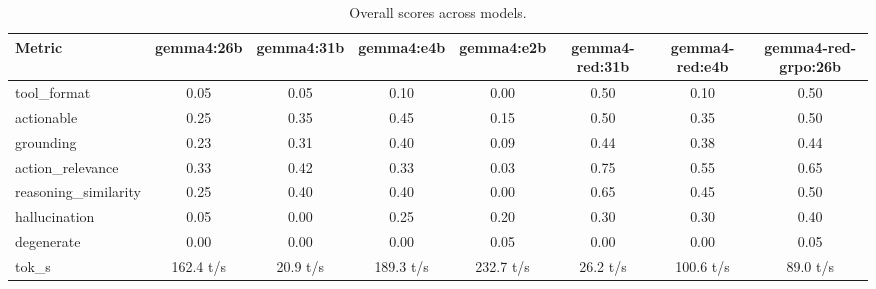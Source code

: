 \begin{table}[h]
\centering\small
\begin{tabular}{lccccccc}
\toprule
Metric & gemma4:26b & gemma4:31b & gemma4:e4b & gemma4:e2b & gemma4-red:31b & gemma4-red:e4b & gemma4-red-grpo:26b \\
\midrule
tool\_format & 0.05 & 0.05 & 0.10 & 0.00 & 0.50 & 0.10 & 0.50 \\
actionable & 0.25 & 0.35 & 0.45 & 0.15 & 0.50 & 0.35 & 0.50 \\
grounding & 0.23 & 0.31 & 0.40 & 0.09 & 0.44 & 0.38 & 0.44 \\
action\_relevance & 0.33 & 0.42 & 0.33 & 0.03 & 0.75 & 0.55 & 0.65 \\
reasoning\_similarity & 0.25 & 0.40 & 0.40 & 0.00 & 0.65 & 0.45 & 0.50 \\
hallucination & 0.05 & 0.00 & 0.25 & 0.20 & 0.30 & 0.30 & 0.40 \\
degenerate & 0.00 & 0.00 & 0.00 & 0.05 & 0.00 & 0.00 & 0.05 \\
tok\_s & 162.4 t/s & 20.9 t/s & 189.3 t/s & 232.7 t/s & 26.2 t/s & 100.6 t/s & 89.0 t/s \\
\bottomrule
\end{tabular}
\caption{Overall scores across models.}
\end{table}
